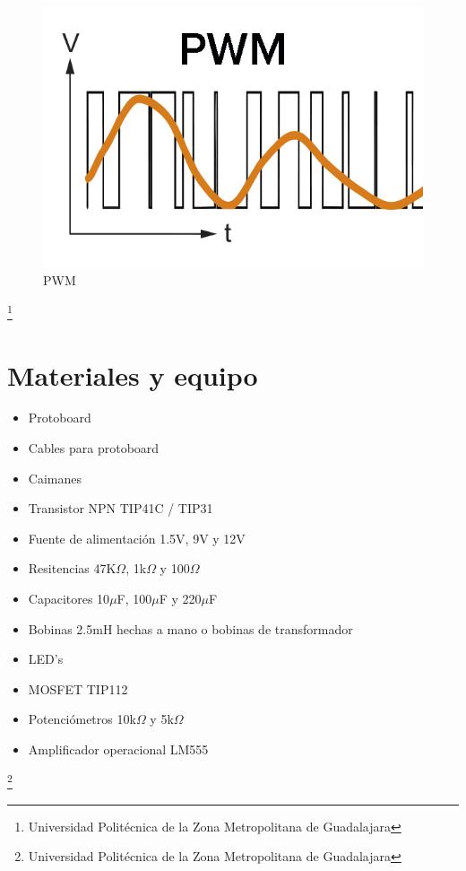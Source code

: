 \documentclass[10pt,a4paper]{article}
\begin{document}
\begin{figure}[hbtp]
\centering
\includegraphics[scale=0.3]{Pictures/pwm.jpg}
\caption{PWM}
\end{figure}

\footnote{Universidad Politécnica de la Zona Metropolitana de Guadalajara}


\newpage
\section{Materiales y equipo}

\begin{itemize}
\item Protoboard
\item Cables para protoboard
\item Caimanes
\item Transistor NPN TIP41C / TIP31
\item Fuente de alimentación 1.5V, 9V  y 12V
\item Resitencias 47K$\Omega$, 1k$\Omega$ y 100$\Omega$
\item Capacitores 10$\mu$F, 100$\mu$F y 220$\mu$F
\item Bobinas 2.5mH hechas a mano o bobinas de transformador
\item LED's 
\item MOSFET TIP112
\item Potenciómetros 10k$\Omega$ y 5k$\Omega$
\item Amplificador operacional LM555
\end{itemize}
\footnote{Universidad Politécnica de la Zona Metropolitana de Guadalajara}

\newpage
\end{document}
